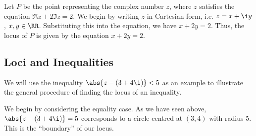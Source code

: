 \begin{example}
    Let $P$ be the point representing the complex number $z$, where $z$ satisfies the equation $\Re z + 2 \Im z = 2$. We begin by writing $z$ in Cartesian form, i.e. $z = x + \i y$, $x, y \in \RR$. Substituting this into the equation, we have $x + 2y = 2$. Thus, the locus of $P$ is given by the equation $x + 2y = 2$.
\end{example}

\subsection{Loci and Inequalities}

We will use the inequality $\abs{z - (3 + 4\i)} < 5$ as an example to illustrate the general procedure of finding the locus of an inequality.

We begin by considering the equality case. As we have seen above, $\abs{z - (3 + 4\i)} = 5$ corresponds to a circle centred at $(3, 4)$ with radius 5. This is the ``boundary'' of our locus.

\begin{figure}[H]
    \centering
    \caption{}
\end{figure}

